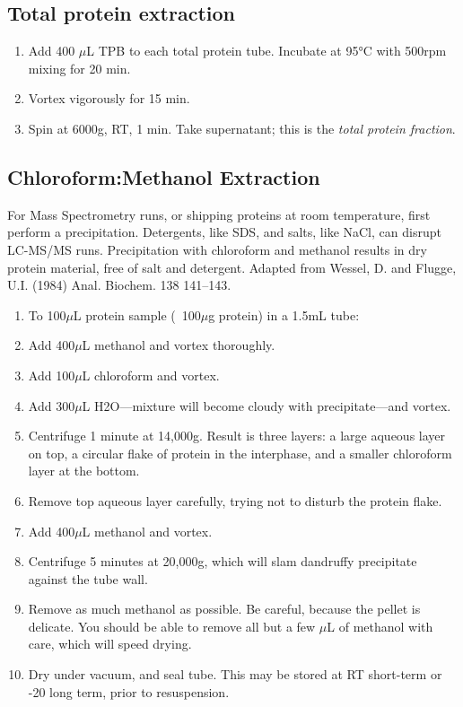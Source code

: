\documentclass{article}
\newcommand{\mul}{\ensuremath{\mu}L\xspace}
\newcommand{\mug}{\ensuremath{\mu}g\xspace}
\newcommand{\degC}{\celsius\xspace}
\begin{document}
\subsection*{Total protein extraction}
\begin{enumerate}[resume]
\item Add 400 \mul TPB to each total protein tube. Incubate at 95°C with 500rpm mixing for 20 min.
\item Vortex vigorously for 15 min.
\item Spin at 6000g, RT, 1 min. Take supernatant; this is the \emph{total protein fraction}. 
\end{enumerate}

\subsection*{Chloroform:Methanol Extraction}
For Mass Spectrometry runs, or shipping proteins at room temperature, first perform a precipitation. Detergents, like SDS, and salts, like NaCl, can disrupt LC-MS/MS runs. Precipitation with chloroform and methanol results in dry protein material, free of salt and detergent. Adapted from Wessel, D. and Flugge, U.I. (1984) Anal. Biochem. 138 141--143.

\begin{enumerate}[resume]
\item To 100\mul protein sample (~100\mug protein) in a 1.5mL tube:
\item Add 400\mul methanol and vortex thoroughly.
\item Add 100\mul chloroform and vortex.
\item Add 300\mul H2O---mixture will become cloudy with precipitate---and vortex.
\item Centrifuge 1 minute at 14,000g. Result is three layers: a large aqueous layer on top, a circular flake of protein in the interphase, and a smaller chloroform layer at the bottom.
\item Remove top aqueous layer carefully, trying not to disturb the protein flake.
\item Add 400\mul methanol and vortex.
\item Centrifuge 5 minutes at 20,000g, which will slam dandruffy precipitate against the tube wall.
\item Remove as much methanol as possible. Be careful, because the pellet is delicate. You should be able to remove all but a few \mul of methanol with care, which will speed drying.
\item Dry under vacuum, and seal tube. This may be stored at RT short-term or -20\degC long term, prior to resuspension.
\end{enumerate}
\end{document}
